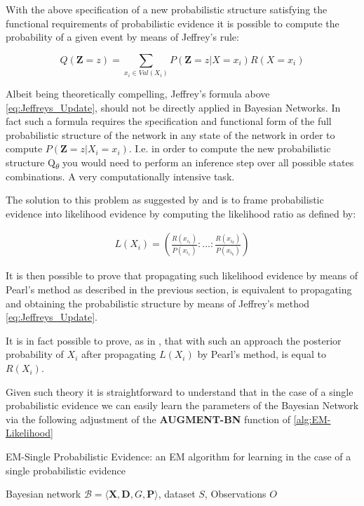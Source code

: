 \documentclass[11pt]{article}
\begin{document}
\begin{article}
With the above specification of a new probabilistic structure
satisfying the functional requirements of probabilistic evidence it
is possible to compute the probability of a given event by means of
Jeffrey's rule:

\begin{equation} \label{eq:Jeffreys_Update}
 Q(\textbf{Z} = z) = \sum_{x_i \in Val(X_i)} P(\textbf{Z} = z | X = x_i) R(X = x_i)
\end{equation}

Albeit being theoretically compelling, Jeffrey's formula above
\ref{eq:Jeffreys_Update}, should not be directly applied in Bayesian
Networks. In fact such a formula requires the specification and
functional form of the full probabilistic structure of the network
in any state of the network in order to compute \(P(\textbf{Z} = z | X_i =
  x_i)\). I.e. in order to compute the new probabilistic structure
Q\textsubscript{\(\theta\)} you would need to perform an inference step over all
possible states combinations. A very computationally intensive task.

The solution to this problem as suggested by \cite{Chan_2005} and
\cite{PENG_2010} is to frame probabilistic evidence into likelihood
evidence by computing the likelihood ratio as defined by:

\begin{align} \label{eq:probabilistic-to-likelihood-evidence}
 L(X_i) = (\frac{R(x_{i_1})}{P(x_{i_1})}: ... : \frac{R(x_{i_k})}{P(x_{i_k})})
\end{align}

It is then possible to prove that propagating such likelihood
evidence by means of Pearl's method as described in the previous
section, is equivalent to propagating and obtaining the probabilistic
structure by means of Jeffrey's method \ref{eq:Jeffreys_Update}.

It is in fact possible to prove, as in \cite{PENG_2010}, that with
such an approach the posterior probability of \(X_i\) after propagating
\(L(X_i)\) by Pearl’s method, is equal to \(R(X_i)\).

Given such theory it is straightforward to understand that
in the case of a single probabilistic evidence we can easily learn
the parameters of the Bayesian Network via the following adjustment
of the \textbf{AUGMENT-BN} function of \ref{alg:EM-Likelihood}

\algrenewcommand\algorithmicindent{1.5em}%

\begin{algorithm*}[h!]
\caption{EM-Single Probabilistic Evidence: an EM algorithm for learning in the case of a single probabilistic evidence}
\label{alg:EM-Probabilistic-Evidence}
\vspace{-10pt}
\begin{multicols}{2}
\begin{algorithmic}[1] 
\Require Bayesian network $\mathcal{B}=\langle \mathbf{X},\mathbf{D}, G, \mathbf{P} \rangle$, dataset $S$, Observations $O$


\end{algorithmic}
\end{multicols}
\end{algorithm*}
\end{article}
\end{document}
